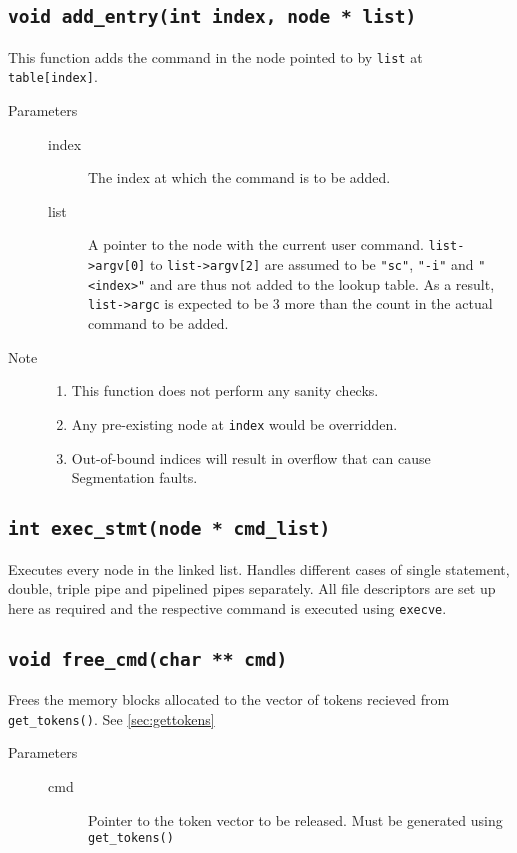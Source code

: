 \documentclass{article}
\begin{document}
\subsection{\lstinline{void add_entry(int index, node * list)}} \label{sec:addentry}
This function adds the command in the node pointed to by \lstinline{list} at \lstinline{table[index]}. 
\begin{description}
	\item[Parameters]\hfill
	\begin{description}
		\item[index] The index at which the command is to be added.
		\item[list] A pointer to the node with the current user command. \lstinline{list->argv[0]} to \lstinline{list->argv[2]} are assumed to be \lstinline{"sc"}, \lstinline{"-i"} and \lstinline{"<index>"} and are thus not added to the lookup table. As a result, \lstinline{list->argc} is expected to be 3 more than the count in the actual command to be added.
	\end{description}
	\item[Note]\hfill
		\begin{enumerate}
			\item This function does not perform any sanity checks. 
			\item Any pre-existing node at \lstinline{index} would be overridden. 
			\item Out-of-bound indices will result in overflow that can cause Segmentation faults.
		\end{enumerate}
\end{description}

\subsection{\lstinline{int exec_stmt(node * cmd_list)}} \label{sec:execcommand}
Executes every node in the linked list. Handles different cases of single statement, double, triple pipe and pipelined pipes separately. All file descriptors are set up here as required and the respective command is executed using \lstinline{execve}.



\subsection{\lstinline{void free_cmd(char ** cmd)}} \label{sec:freecmd}
Frees the memory blocks allocated to the vector of tokens recieved from \lstinline{get_tokens()}. See \ref{sec:gettokens}
\begin{description}
	\item[Parameters]\hfill
	\begin{description}
		\item[cmd] Pointer to the token vector to be released. Must be generated using \lstinline{get_tokens()}
	\end{description}
\end{description}
\end{document}
